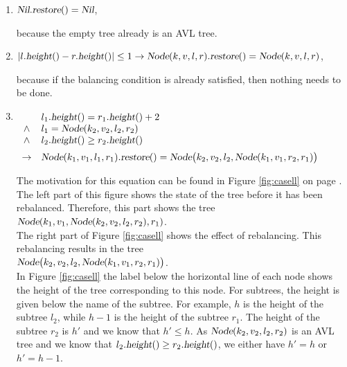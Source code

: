 \begin{enumerate}
\item $\textsl{Nil}.\textsl{restore}() = \textsl{Nil}$,

      because the empty tree already is an  AVL tree.
\item $|l.\textsl{height}() - r.\textsl{height}()| \leq 1 \rightarrow 
       \textsl{Node}(k,v,l,r).\textsl{restore}() = \textsl{Node}(k,v,l,r)$,

      because if the balancing condition is already satisfied, then nothing needs to be done. 
\item $\begin{array}[t]{cl}
              & l_1.\textsl{height}() = r_1.\textsl{height}() + 2    \\ 
       \wedge & l_1 = \textsl{Node}(k_2,v_2,l_2,r_2)                 \\
       \wedge & l_2.\textsl{height}() \geq r_2.\textsl{height}()     \\[0.2cm]
       \rightarrow & \textsl{Node}(k_1,v_1,l_1,r_1).\textsl{restore}() = 
                     \textsl{Node}\bigl(k_2,v_2,l_2,\textsl{Node}(k_1,v_1,r_2,r_1)\bigr)
       \end{array}
      $

      The motivation for this equation can be found in Figure \ref{fig:casell}
      on page \pageref{fig:casell}.  The left part of this figure shows the state
      of the tree before it has been rebalanced.  Therefore, this part shows the tree
      \\[0.2cm]
      \hspace*{1.3cm}
      $\textsl{Node}(k_1,v_1, \textsl{Node}(k_2,v_2,l_2,r_2), r_1)$. 
      \\[0.2cm]
      The right part of Figure \ref{fig:casell} shows the effect of rebalancing.  
      This rebalancing results in the tree
      \\[0.2cm]
      \hspace*{1.3cm}
      $\textsl{Node}\bigl(k_2,v_2,l_2,\textsl{Node}(k_1,v_1,r_2,r_1)\bigr)$.
      \\[0.2cm]
      In Figure \ref{fig:casell} the label below the horizontal line of each node shows the height
      of the tree corresponding to this node.  For subtrees, the height is given below the name of
      the subtree.  For example,  $h$ is the height of the subtree 
      $l_2$, while $h-1$ is the height of the subtree $r_1$. The height of the subtree $r_2$
      is $h'$ and we know that $h' \leq h$.  As $\textsl{Node}(k_2,v_2,l_2,r_2)$ is an AVL tree and we know that
      $l_2.\textsl{height}() \geq r_2.\textsl{height}()$, we
      either have $h' = h$ or $h' = h-1$.


\end{enumerate}
